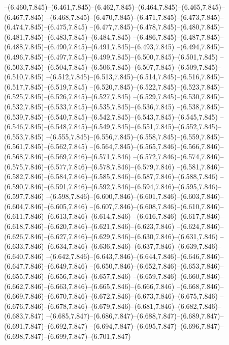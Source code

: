   --(6.460,7.845)--(6.461,7.845)--(6.462,7.845)--(6.464,7.845)--(6.465,7.845)--(6.467,7.845)%
  --(6.468,7.845)--(6.470,7.845)--(6.471,7.845)--(6.473,7.845)--(6.474,7.845)--(6.475,7.845)%
  --(6.477,7.845)--(6.478,7.845)--(6.480,7.845)--(6.481,7.845)--(6.483,7.845)--(6.484,7.845)%
  --(6.486,7.845)--(6.487,7.845)--(6.488,7.845)--(6.490,7.845)--(6.491,7.845)--(6.493,7.845)%
  --(6.494,7.845)--(6.496,7.845)--(6.497,7.845)--(6.499,7.845)--(6.500,7.845)--(6.501,7.845)%
  --(6.503,7.845)--(6.504,7.845)--(6.506,7.845)--(6.507,7.845)--(6.509,7.845)--(6.510,7.845)%
  --(6.512,7.845)--(6.513,7.845)--(6.514,7.845)--(6.516,7.845)--(6.517,7.845)--(6.519,7.845)%
  --(6.520,7.845)--(6.522,7.845)--(6.523,7.845)--(6.525,7.845)--(6.526,7.845)--(6.527,7.845)%
  --(6.529,7.845)--(6.530,7.845)--(6.532,7.845)--(6.533,7.845)--(6.535,7.845)--(6.536,7.845)%
  --(6.538,7.845)--(6.539,7.845)--(6.540,7.845)--(6.542,7.845)--(6.543,7.845)--(6.545,7.845)%
  --(6.546,7.845)--(6.548,7.845)--(6.549,7.845)--(6.551,7.845)--(6.552,7.845)--(6.553,7.845)%
  --(6.555,7.845)--(6.556,7.845)--(6.558,7.845)--(6.559,7.845)--(6.561,7.845)--(6.562,7.845)%
  --(6.564,7.845)--(6.565,7.846)--(6.566,7.846)--(6.568,7.846)--(6.569,7.846)--(6.571,7.846)%
  --(6.572,7.846)--(6.574,7.846)--(6.575,7.846)--(6.577,7.846)--(6.578,7.846)--(6.579,7.846)%
  --(6.581,7.846)--(6.582,7.846)--(6.584,7.846)--(6.585,7.846)--(6.587,7.846)--(6.588,7.846)%
  --(6.590,7.846)--(6.591,7.846)--(6.592,7.846)--(6.594,7.846)--(6.595,7.846)--(6.597,7.846)%
  --(6.598,7.846)--(6.600,7.846)--(6.601,7.846)--(6.603,7.846)--(6.604,7.846)--(6.605,7.846)%
  --(6.607,7.846)--(6.608,7.846)--(6.610,7.846)--(6.611,7.846)--(6.613,7.846)--(6.614,7.846)%
  --(6.616,7.846)--(6.617,7.846)--(6.618,7.846)--(6.620,7.846)--(6.621,7.846)--(6.623,7.846)%
  --(6.624,7.846)--(6.626,7.846)--(6.627,7.846)--(6.629,7.846)--(6.630,7.846)--(6.631,7.846)%
  --(6.633,7.846)--(6.634,7.846)--(6.636,7.846)--(6.637,7.846)--(6.639,7.846)--(6.640,7.846)%
  --(6.642,7.846)--(6.643,7.846)--(6.644,7.846)--(6.646,7.846)--(6.647,7.846)--(6.649,7.846)%
  --(6.650,7.846)--(6.652,7.846)--(6.653,7.846)--(6.655,7.846)--(6.656,7.846)--(6.657,7.846)%
  --(6.659,7.846)--(6.660,7.846)--(6.662,7.846)--(6.663,7.846)--(6.665,7.846)--(6.666,7.846)%
  --(6.668,7.846)--(6.669,7.846)--(6.670,7.846)--(6.672,7.846)--(6.673,7.846)--(6.675,7.846)%
  --(6.676,7.846)--(6.678,7.846)--(6.679,7.846)--(6.681,7.846)--(6.682,7.846)--(6.683,7.847)%
  --(6.685,7.847)--(6.686,7.847)--(6.688,7.847)--(6.689,7.847)--(6.691,7.847)--(6.692,7.847)%
  --(6.694,7.847)--(6.695,7.847)--(6.696,7.847)--(6.698,7.847)--(6.699,7.847)--(6.701,7.847)%
